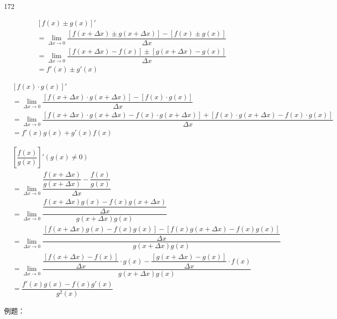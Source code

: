 \begin{dingautolist}{172}
    \item \begin{align*}
        & [f(x) \pm g(x)]'  \\
        & = \lim\limits_{\Delta x \to 0}\dfrac{[f(x+\Delta x) \pm g(x+\Delta x)] - [f(x)\pm g(x)]}{\Delta x} \\
        & = \lim\limits_{\Delta x \to 0}\dfrac{[f(x+\Delta x) - f(x)] \pm [g(x+\Delta x) - g(x)]}{\Delta x} \\
        & = f'(x) \pm g'(x)
    \end{align*}
    \item \begin{align*}
        & [f(x) \cdot g(x)]' \\
        & = \lim\limits_{\Delta x \to 0}\dfrac{[f(x+\Delta x) \cdot g(x+\Delta x)] - [f(x) \cdot g(x)]}{\Delta x} \\
        & = \lim\limits_{\Delta x \to 0}\dfrac{[f(x+\Delta x) \cdot g(x+\Delta x) - f(x) \cdot g(x+\Delta x)] + [f(x) \cdot g(x+\Delta x) - f(x) \cdot g(x)]}{\Delta x} \\
        & = f'(x)g(x) + g'(x)f(x)
    \end{align*}
    \item \begin{align*}
        & \left[\dfrac{f(x)}{g(x)}\right]' (g(x) \neq 0) \\
        & = \lim\limits_{\Delta x \to 0}\dfrac{\dfrac{f(x + \Delta x)}{g(x+\Delta x)} - \dfrac{f(x)}{g(x)}}{\Delta x} \\
        & = \lim\limits_{\Delta x \to 0}\dfrac{\dfrac{f(x + \Delta x)g(x) - f(x)g(x+\Delta x)}{\Delta x}}{g(x+\Delta x)g(x)} \\
        & = \lim\limits_{\Delta x \to 0}\dfrac{\dfrac{[f(x + \Delta x)g(x) - f(x)g(x)] - [f(x)g(x+\Delta x)-f(x)g(x)]}{\Delta x}}{g(x+\Delta x)g(x)} \\
        & = \lim\limits_{\Delta x \to 0}\dfrac{\dfrac{[f(x + \Delta x) - f(x)]}{\Delta x} \cdot g(x) - \dfrac{[g(x+\Delta x)-g(x)]}{\Delta x} \cdot f(x)}{g(x+\Delta x)g(x)} \\
        & = \dfrac{f'(x)g(x) - f(x)g'(x)}{g^2(x)} 
        \end{align*}
\end{dingautolist}
例题：
